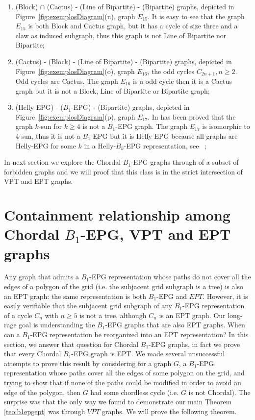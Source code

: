 \begin{enumerate}[label=(\arabic*)]
      \item (Block) $\cap$  (Cactus) -  (Line of Bipartite) - (Bipartite) graphs, depicted in Figure~\ref{fig:exemplosDiagram}(n), graph $E_{15}$. It is easy to see that the graph $E_{15}$ is both Block and Cactus graph, but it has a cycle of size three and a claw as induced subgraph, thus this graph is not Line of Bipartite nor Bipartite;%
      \item (Cactus) - (Block) -  (Line of Bipartite) - (Bipartite) graphs, depicted in Figure~\ref{fig:exemplosDiagram}(o), graph $E_{16}$, the odd cycles $C_{2n+1},n\geq 2$. Odd cycles are Cactus. The graph $E_{16}$ is a odd cycle then it is a Cactus graph but it is not a Block, Line of Bipartite or Bipartite graph;%
      \item (Helly EPG) - ($B_1$-EPG)  - (Bipartite) graphs, depicted in Figure~\ref{fig:exemplosDiagram}(p), graph  $E_{17}$. In \citeauthor{golumbic2009} \cite{golumbic2009} has been proved that the graph $k$-sun for $k\geq 4$ is not a $B_1$-EPG graph. The graph $E_{17}$ is isomorphic to $4$-sun, thus it is not a  $B_1$-EPG but it is Helly-EPG because all graphs are Helly-EPG for some $k$ in a Helly-$B_k$-EPG representation, see
     ~\cite{dmtcs:6506};%
\end{enumerate}







In next section we explore the Chordal $B_1$-EPG graphs through of a subset of forbidden graphs and we will proof that this class is in the strict intersection of VPT and EPT graphs.

\section{Containment relationship among Chordal $B_1$-EPG, VPT and EPT graphs }


 Any graph that
admits a $B_1$-EPG representation  whose paths do not cover all the edges of a polygon of the grid (i.e.
the subjacent grid subgraph is a tree)  is also an EPT graph: the same representation is both $B_1$-EPG and $EPT$.
However, it is easily verifiable that the subjacent grid subgraph of any $B_1$-EPG representation of a cycle $C_n$ with $n\geq 5$ is not a tree,
although $C_n$ is an  EPT graph.  Our long-rage goal is 
understanding the $B_1$-EPG graphs that are also EPT graphs. When can a $B_1$-EPG representation
be reorganized into an EPT representation?  In this section,
 we answer that question for Chordal $B_1$-EPG graphs, in fact we prove that every Chordal $B_1$-EPG graph is EPT. We
 made several unsuccessful attempts to prove this result by considering for a graph $G$, a $B_1$-EPG representation whose paths cover all the edges
 of some polygon on the grid, and trying  to show  that if none of the paths could be modified in order to avoid an edge of the polygon,
 then $G$ had some chordless  cycle (i.e. $G$ is not Chordal). The surprise was that the only way we found to demonstrate our main Theorem \ref{teo:b1epgept} was through $VPT$ graphs.
 We will prove the following theorem.

